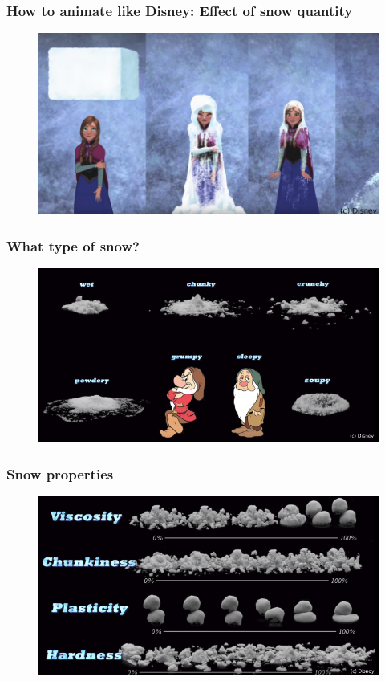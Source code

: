 \documentclass[notes]{beamer}
\begin{document}
\begin{frame}
	\frametitle{How to animate like Disney: Effect of snow quantity}
	\begin{figure}[ht]
		\centering
		\includegraphics[width=\textwidth]{figs/anna-quantity-snow.png}
	\end{figure}
\end{frame}

\begin{frame}
	\frametitle{What type of snow?}
	\begin{figure}[ht]
		\centering
		\includegraphics[width=\textwidth]{figs/snow-types.png}
	\end{figure}
\end{frame}

\begin{frame}
	\frametitle{Snow properties}
	\begin{figure}[ht]
		\centering
		\includegraphics[width=\textwidth]{figs/snow.png}
	\end{figure}
\end{frame}
\end{document}
